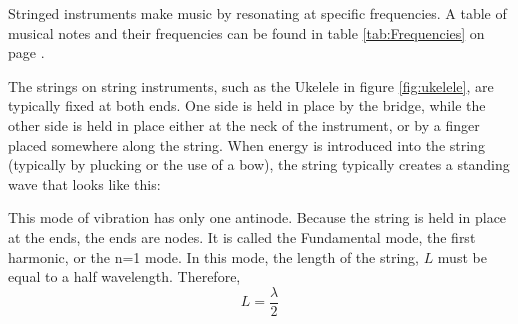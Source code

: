 	Stringed instruments make music by resonating at specific frequencies.  A table of musical notes and their frequencies can be found in table \ref{tab:Frequencies} on page \pageref{tab:Frequencies}.  
	
	The strings on string instruments, such as the Ukelele in figure \ref{fig:ukelele}, are typically fixed at both ends.  One side is held in place by the bridge, while the other side is held in place either at the neck of the instrument, or by a finger placed somewhere along the string.  When energy is introduced into the string (typically by plucking or the use of a bow), the string typically creates a standing wave that looks like this:
	
	
		
		

	This mode of vibration has only one \gls{antinode}.  Because the string is held in place at the ends, the ends are \gls{node}s.  It is called the Fundamental mode, the first harmonic, or the n=1 mode.    In this mode, the length of the string, $L$ must be equal to a half wavelength.  Therefore, 
	\begin{equation}
		L=\frac{\lambda}{2}
	\end{equation}
	
